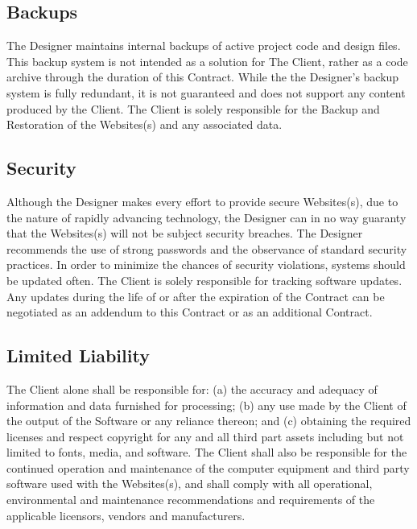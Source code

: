 \documentclass[usletter,12pt]{article} %
\begin{document}

\subsection{Backups}

The Designer maintains internal backups of active project code and design files. This backup system is not intended as a solution for The Client, rather as a code archive through the duration of this Contract. While the the Designer's backup system is fully redundant, it is not guaranteed and does not support any content produced by the Client. The Client is solely responsible for the Backup and Restoration of the Websites(s) and any associated data.


\subsection{Security}

Although the Designer makes every effort to provide secure Websites(s), due to the nature of rapidly advancing technology, the Designer can in no way guaranty that the Websites(s) will not be subject security breaches. The Designer recommends the use of strong passwords and the observance of standard security practices. In order to minimize the chances of security violations, systems should be updated often. The Client is solely responsible for tracking software updates. Any updates during the life of or after the expiration of the Contract can be negotiated as an addendum to this Contract or as an additional Contract.


\subsection{Limited Liability}

The Client alone shall be responsible for: (a) the accuracy and adequacy of information and data furnished for processing; (b) any use made by the Client of the output of the Software or any reliance thereon; and (c) obtaining the required licenses and respect copyright for any and all third part assets including but not limited to fonts, media, and software. The Client shall also be responsible for the continued operation and maintenance of the computer equipment and third party software used with the Websites(s), and shall comply with all operational, environmental and maintenance recommendations and requirements of the applicable licensors, vendors and manufacturers.
\end{document}
